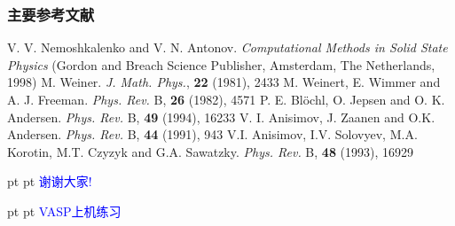 \documentclass[cjk,slidestop,compress,mathserif,blue]{beamer}
\begin{document}
\begin{thebibliography}{99}
\frame
{
\frametitle{主要参考文献}
{\small
\textrm{V. V. Nemoshkalenko and V. N. Antonov. \textit{Computational Methods in Solid State Physics} (Gordon and Breach Science Publisher, Amsterdam, The Netherlands, 1998)}
\textrm{M. Weiner. \textit{J. Math. Phys.}, \textbf{22} (1981), 2433}
\textrm{M. Weinert, E. Wimmer and A. J. Freeman. \textit{Phys. Rev.} B, \textbf{26} (1982), 4571}
\textrm{P. E. Bl\"ochl, O. Jepsen and O. K. Andersen. \textit{Phys. Rev.} B, \textbf{49} (1994), 16233}
\textrm{V. I. Anisimov, J. Zaanen and O.K. Andersen. \textit{Phys. Rev.} B, \textbf{44} (1991), 943}
\textrm{V.I. Anisimov, I.V. Solovyev, M.A. Korotin, M.T. Czyzyk and G.A. Sawatzky. \textit{Phys. Rev.} B, \textbf{48} (1993), 16929}
\nocite{*}																				%
}
}
\end{thebibliography}


\frame
{
 pt
 pt
\hskip 60pt \textcolor{blue}{\Huge \textrm{谢谢大家\:!}}
}

\frame
{
 pt
 pt
\hskip 60pt \textcolor{blue}{\Huge \textrm{VASP}上机练习}
}

\clearpage
\end{document}
